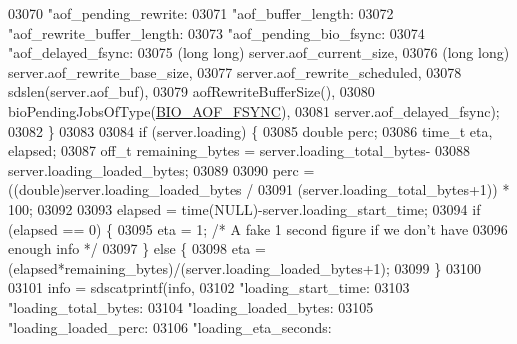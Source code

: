 \begin{DoxyCode}
{{{{{{{{{{{{{{{{{{{{{{{{{{{{{{{{{{{{{{{{{{{{{{{{{{{{{{{{{{{{{{{{{{{{{{{{{{{{{{{{{{{{{{{{{{{{{{{{{{{{{{{{03070                 \textcolor{stringliteral}{"aof\_pending\_rewrite:%
03071                 \textcolor{stringliteral}{"aof\_buffer\_length:%
03072                 \textcolor{stringliteral}{"aof\_rewrite\_buffer\_length:%
03073                 \textcolor{stringliteral}{"aof\_pending\_bio\_fsync:%
03074                 \textcolor{stringliteral}{"aof\_delayed\_fsync:%
03075                 (\textcolor{keywordtype}{long} \textcolor{keywordtype}{long}) server.aof\_current\_size,
03076                 (\textcolor{keywordtype}{long} \textcolor{keywordtype}{long}) server.aof\_rewrite\_base\_size,
03077                 server.aof\_rewrite\_scheduled,
03078                 sdslen(server.aof\_buf),
03079                 aofRewriteBufferSize(),
03080                 bioPendingJobsOfType(\hyperlink{bio_8h_a5d03c967316addafc61b7ed5d957984f}{BIO\_AOF\_FSYNC}),
03081                 server.aof\_delayed\_fsync);
03082         \}
03083 
03084         \textcolor{keywordflow}{if} (server.loading) \{
03085             \textcolor{keywordtype}{double} perc;
03086             time\_t eta, elapsed;
03087             off\_t remaining\_bytes = server.loading\_total\_bytes-
03088                                     server.loading\_loaded\_bytes;
03089 
03090             perc = ((\textcolor{keywordtype}{double})server.loading\_loaded\_bytes /
03091                    (server.loading\_total\_bytes+1)) * 100;
03092 
03093             elapsed = time(NULL)-server.loading\_start\_time;
03094             \textcolor{keywordflow}{if} (elapsed == 0) \{
03095                 eta = 1; \textcolor{comment}{/* A fake 1 second figure if we don't have}
03096 \textcolor{comment}{                            enough info */}
03097             \} \textcolor{keywordflow}{else} \{
03098                 eta = (elapsed*remaining\_bytes)/(server.loading\_loaded\_bytes+1);
03099             \}
03100 
03101             info = sdscatprintf(info,
03102                 \textcolor{stringliteral}{"loading\_start\_time:%
03103                 \textcolor{stringliteral}{"loading\_total\_bytes:%
03104                 \textcolor{stringliteral}{"loading\_loaded\_bytes:%
03105                 \textcolor{stringliteral}{"loading\_loaded\_perc:%
03106                 \textcolor{stringliteral}{"loading\_eta\_seconds:%
}}}}}}}}}}}}}}}}}}}}}}}}}}}}}}}}}}}}}}}}}}}}}}}}}}}}}}}}}}}}}}}}}}}}}}}}}}}}}}}}}}}}}}}}}}}}}}}}}}}}}}}}}}}}}}}}}}
\end{DoxyCode}
